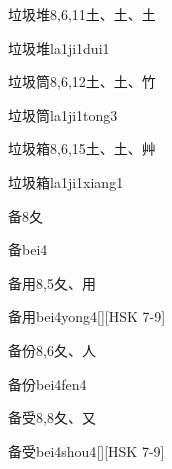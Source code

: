 \begin{Entry}{垃圾堆}{8,6,11}{⼟、⼟、⼟}
  \begin{Phonetics}{垃圾堆}{la1ji1dui1}
  \end{Phonetics}
\end{Entry}

\begin{Entry}{垃圾筒}{8,6,12}{⼟、⼟、⽵}
  \begin{Phonetics}{垃圾筒}{la1ji1tong3}
  \end{Phonetics}
\end{Entry}

\begin{Entry}{垃圾箱}{8,6,15}{⼟、⼟、⾋}
  \begin{Phonetics}{垃圾箱}{la1ji1xiang1}
  \end{Phonetics}
\end{Entry}

\begin{Entry}{备}{8}{⼡}
  \begin{Phonetics}{备}{bei4}
  \end{Phonetics}
\end{Entry}

\begin{Entry}{备用}{8,5}{⼡、⽤}
  \begin{Phonetics}{备用}{bei4yong4}[][HSK 7-9]
  \end{Phonetics}
\end{Entry}

\begin{Entry}{备份}{8,6}{⼡、⼈}
  \begin{Phonetics}{备份}{bei4fen4}
  \end{Phonetics}
\end{Entry}

\begin{Entry}{备受}{8,8}{⼡、⼜}
  \begin{Phonetics}{备受}{bei4shou4}[][HSK 7-9]
  \end{Phonetics}
\end{Entry}

